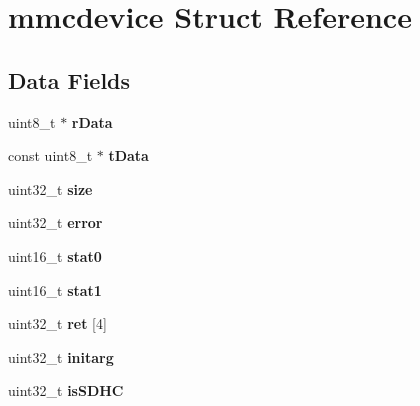 \hypertarget{structmmcdevice}{}\section{mmcdevice Struct Reference}
\label{structmmcdevice}
\subsection*{Data Fields}
\begin{DoxyCompactItemize}
\item 
uint8\+\_\+t $\ast$ {\bfseries r\+Data}\hypertarget{structmmcdevice_a4cacf2f42399afa6b083922da18bc6c6}{}\label{structmmcdevice_a4cacf2f42399afa6b083922da18bc6c6}

\item 
const uint8\+\_\+t $\ast$ {\bfseries t\+Data}\hypertarget{structmmcdevice_a0eb61cc2ced7861109f5f840403f49b3}{}\label{structmmcdevice_a0eb61cc2ced7861109f5f840403f49b3}

\item 
uint32\+\_\+t {\bfseries size}\hypertarget{structmmcdevice_a173549a0d8ce8dcd74ce73cdda20566f}{}\label{structmmcdevice_a173549a0d8ce8dcd74ce73cdda20566f}

\item 
uint32\+\_\+t {\bfseries error}\hypertarget{structmmcdevice_a023cc604c32a72e1d4b911ba45c667d6}{}\label{structmmcdevice_a023cc604c32a72e1d4b911ba45c667d6}

\item 
uint16\+\_\+t {\bfseries stat0}\hypertarget{structmmcdevice_a64a3e0a6dbe30fef091797ba4e51724a}{}\label{structmmcdevice_a64a3e0a6dbe30fef091797ba4e51724a}

\item 
uint16\+\_\+t {\bfseries stat1}\hypertarget{structmmcdevice_af9f2212ba1ec6ce368d2d37ecc01c8f8}{}\label{structmmcdevice_af9f2212ba1ec6ce368d2d37ecc01c8f8}

\item 
uint32\+\_\+t {\bfseries ret} \mbox{[}4\mbox{]}\hypertarget{structmmcdevice_a2027a0954d909d8c305943d51c650bc7}{}\label{structmmcdevice_a2027a0954d909d8c305943d51c650bc7}

\item 
uint32\+\_\+t {\bfseries initarg}\hypertarget{structmmcdevice_a6a6ec61e50188193b07f13b56266eb7d}{}\label{structmmcdevice_a6a6ec61e50188193b07f13b56266eb7d}

\item 
uint32\+\_\+t {\bfseries is\+S\+D\+HC}\hypertarget{structmmcdevice_a945e7e81f989eac1edffc32a68984173}{}\label{structmmcdevice_a945e7e81f989eac1edffc32a68984173}


\end{DoxyCompactItemize}
